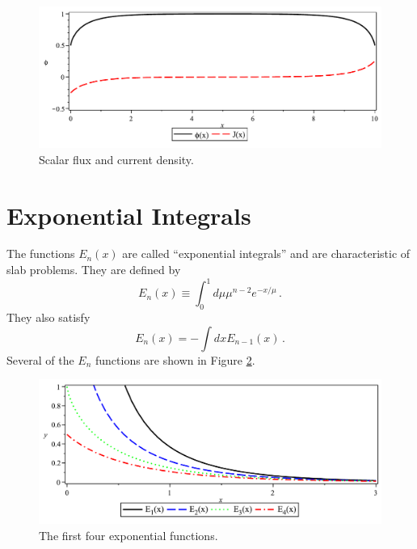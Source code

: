\begin{figure}[ht] 
    \centering
    \includegraphics[keepaspectratio, width = 5.0 in]{images/slab_example_phi_current}
    \caption{Scalar flux and current density.}
    \label{fig:slab_example_phi_current}
\end{figure}

\section*{Exponential Integrals}

The functions $E_n(x)$ are called ``exponential integrals'' and are characteristic of slab problems.  They are defined by
\begin{equation}
 E_n(x) \equiv \int^1_0 d\mu \mu^{n-2} e^{-x/\mu} \, .
 \label{eq:EnDefinition}
\end{equation}
They also satisfy
\begin{equation}
 E_n(x) = - \int dx E_{n-1}(x) \, .
 \label{eq:EnIntegration}
\end{equation}
Several of the $E_n$ functions are shown in Figure \ref{fig:slab_example_exp_functions}.

\begin{figure}[ht] 
    \centering
    \includegraphics[keepaspectratio, width = 5.0 in]{images/slab_example_exp_functions}
    \caption{The first four exponential functions.}
    \label{fig:slab_example_exp_functions}
\end{figure}

